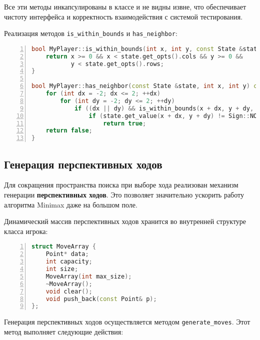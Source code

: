 \noindent Все эти методы инкапсулированы в классе и не видны извне, что обеспечивает чистоту интерфейса и корректность взаимодействия с системой тестирования.

\vspace{0.5em}

\noindent Реализация методов \verb|is_within_bounds| и \verb|has_neighbor|:

\begin{lstlisting}[language=C++,numbers=left,caption={Вспомогательные методы класса игрока},label={lst:helper_methods}]
bool MyPlayer::is_within_bounds(int x, int y, const State &state) const {
    return x >= 0 && x < state.get_opts().cols && y >= 0 &&
           y < state.get_opts().rows;
}

bool MyPlayer::has_neighbor(const State &state, int x, int y) const {
    for (int dx = -2; dx <= 2; ++dx)
        for (int dy = -2; dy <= 2; ++dy)
            if ((dx || dy) && is_within_bounds(x + dx, y + dy, state))
                if (state.get_value(x + dx, y + dy) != Sign::NONE)
                    return true;
    return false;
}
\end{lstlisting}

\subsection{Генерация перспективных ходов}

Для сокращения пространства поиска при выборе хода реализован механизм генерации \textbf{перспективных ходов}. Это позволяет значительно ускорить работу алгоритма Minimax даже на большом поле.

\vspace{1ex}

Динамический массив перспективных ходов хранится во внутренней структуре класса игрока:

\begin{lstlisting}[language=C++,caption={Фрагмент класса MyPlayer: структура MoveArray},label={lst:move_array},numbers=left]
struct MoveArray {
    Point* data;
    int capacity;
    int size;
    MoveArray(int max_size);
    ~MoveArray();
    void clear();
    void push_back(const Point& p);
};
\end{lstlisting}

\vspace{1ex}

Генерация перспективных ходов осуществляется методом \texttt{generate\_moves}. Этот метод выполняет следующие действия:

